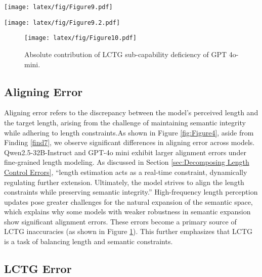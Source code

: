\begin{figure*}[t]
    \begin{minipage}{0.51\textwidth}
        \centering
        \texttt{[image: latex/fig/Figure9.pdf]}
    \end{minipage}
    \hfill
    \begin{minipage}{0.51\textwidth}
        \centering
        \texttt{[image: latex/fig/Figure9.2.pdf]}
    \end{minipage}

    \caption{Error analyses of fundamental abilities in LCTG on CNN/DailyMail.}
    \label{fig:Figure9}
\end{figure*}


\begin{figure}[h]
  \texttt{[image: latex/fig/Figure10.pdf]}
  \caption{Absolute contribution of LCTG sub-capability deficiency of GPT 4o-mini.}
  \label{fig:Figure10}
\end{figure}

\subsection{Aligning Error}  


Aligning error refers to the discrepancy between the model’s perceived length and the target length, arising from the challenge of maintaining semantic integrity while adhering to length constraints.As shown in Figure \ref{fig:Figure4}, aside from Finding \ref{find7}, we observe significant differences in aligning error across models. Qwen2.5-32B-Instruct and GPT-4o mini exhibit larger alignment errors under fine-grained length modeling. As discussed in Section \ref{sec:Decomposing Length Control Errors}, “length estimation acts as a real-time constraint, dynamically regulating further extension. Ultimately, the model strives to align the length constraints while preserving semantic integrity.” High-frequency length perception updates pose greater challenges for the natural expansion of the semantic space, which explains why some models with weaker robustness in semantic expansion show significant alignment errors. These errors become a primary source of LCTG inaccuracies (as shown in Figure \ref{fig:Figure10}). This further emphasizes that LCTG is a task of balancing length and semantic constraints.




\subsection{LCTG Error}

